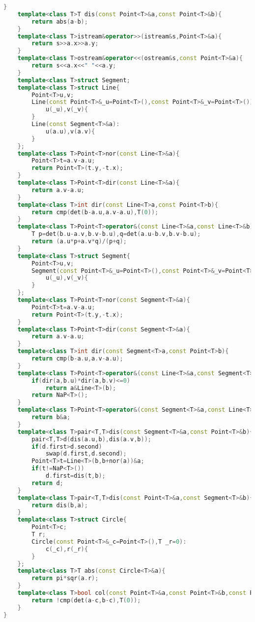 \documentclass{book}
\begin{document}
\begin{lstlisting}[language=C++,title={Geometry 2D.hpp (5031 bytes, 159 lines)}]
    }
    template<class T>T dis(const Point<T>&a,const Point<T>&b){
        return abs(a-b);
    }
    template<class T>istream&operator>>(istream&s,Point<T>&a){
        return s>>a.x>>a.y;
    }
    template<class T>ostream&operator<<(ostream&s,const Point<T>&a){
        return s<<a.x<<" "<<a.y;
    }
    template<class T>struct Segment;
    template<class T>struct Line{
        Point<T>u,v;
        Line(const Point<T>&_u=Point<T>(),const Point<T>&_v=Point<T>()):
            u(_u),v(_v){
        }
        Line(const Segment<T>&a):
            u(a.u),v(a.v){
        }
    };
    template<class T>Point<T>nor(const Line<T>&a){
        Point<T>t=a.v-a.u;
        return Point<T>(t.y,-t.x);
    }
    template<class T>Point<T>dir(const Line<T>&a){
        return a.v-a.u;
    }
    template<class T>int dir(const Line<T>a,const Point<T>b){
        return cmp(det(b-a.u,a.v-a.u),T(0));
    }
    template<class T>Point<T>operator&(const Line<T>&a,const Line<T>&b){
        T p=det(b.u-a.v,b.v-b.u),q=det(a.u-b.v,b.v-b.u);
        return (a.u*p+a.v*q)/(p+q);
    }
    template<class T>struct Segment{
        Point<T>u,v;
        Segment(const Point<T>&_u=Point<T>(),const Point<T>&_v=Point<T>()):
            u(_u),v(_v){
        }
    };
    template<class T>Point<T>nor(const Segment<T>&a){
        Point<T>t=a.v-a.u;
        return Point<T>(t.y,-t.x);
    }
    template<class T>Point<T>dir(const Segment<T>&a){
        return a.v-a.u;
    }
    template<class T>int dir(const Segment<T>a,const Point<T>b){
        return cmp(b-a.u,a.v-a.u);
    }
    template<class T>Point<T>operator&(const Line<T>&a,const Segment<T>&b){
        if(dir(a,b.u)*dir(a,b.v)<=0)
            return a&Line<T>(b);
        return NaP<T>();
    }
    template<class T>Point<T>operator&(const Segment<T>&a,const Line<T>&b){
        return b&a;
    }
    template<class T>pair<T,T>dis(const Segment<T>&a,const Point<T>&b){
        pair<T,T>d(dis(a.u,b),dis(a.v,b));
        if(d.first>d.second)
            swap(d.first,d.second);
        Point<T>t=Line<T>(b,b+nor(a))&a;
        if(t!=NaP<T>())
            d.first=dis(t,b);
        return d;
    }
    template<class T>pair<T,T>dis(const Point<T>&a,const Segment<T>&b){
        return dis(b,a);
    }
    template<class T>struct Circle{
        Point<T>c;
        T r;
        Circle(const Point<T>&_c=Point<T>(),T _r=0):
            c(_c),r(_r){
        }
    };
    template<class T>T abs(const Circle<T>&a){
        return pi*sqr(a.r);
    }
    template<class T>bool col(const Point<T>&a,const Point<T>&b,const Point<T>&c){
        return !cmp(det(a-c,b-c),T(0));
    }
}
\end{lstlisting}
\end{document}
